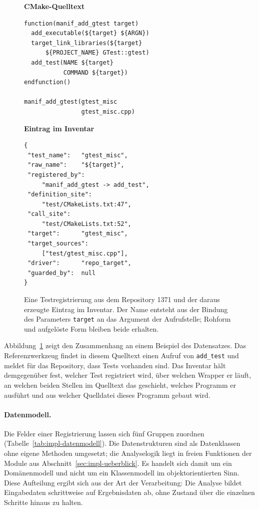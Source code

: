 \documentclass[12pt,a4paper,twoside,headsepline,parskip=half]{scrreprt}
\begin{document}
\begin{figure}[H]
    \centering
    \scriptsize
    \begin{minipage}[t]{0.35\textwidth}
        \textbf{\footnotesize CMake-Quelltext}
\begin{verbatim}
function(manif_add_gtest target)
  add_executable(${target} ${ARGN})
  target_link_libraries(${target}
      ${PROJECT_NAME} GTest::gtest)
  add_test(NAME ${target}
           COMMAND ${target})
endfunction()

manif_add_gtest(gtest_misc
                gtest_misc.cpp)
\end{verbatim}
    \end{minipage}\hspace{0.04\textwidth}%
    \begin{minipage}[t]{0.36\textwidth}
        \textbf{\footnotesize Eintrag im Inventar}
\begin{verbatim}
{
 "test_name":   "gtest_misc",
 "raw_name":    "${target}",
 "registered_by":
     "manif_add_gtest -> add_test",
 "definition_site":
     "test/CMakeLists.txt:47",
 "call_site":
     "test/CMakeLists.txt:52",
 "target":      "gtest_misc",
 "target_sources":
     ["test/gtest_misc.cpp"],
 "driver":      "repo_target",
 "guarded_by":  null
}
\end{verbatim}
    \end{minipage}

    \captionsetup{width=0.75\linewidth}
    \caption{Eine Testregistrierung aus dem Repository 1371 und der daraus erzeugte
    Eintrag im Inventar. Der Name entsteht aus der Bindung des Parameters
    \texttt{target} an das Argument der Aufrufstelle; Rohform und aufgelöste Form
    bleiben beide erhalten.}
    \label{fig:impl-inventar}
\end{figure}

Abbildung~\ref{fig:impl-inventar} zeigt den Zusammenhang an einem Beispiel des
Datensatzes. Das Referenzwerkzeug findet in diesem Quelltext einen Aufruf von
\texttt{add\_test} und meldet für das Repository, dass Tests vorhanden sind. Das
Inventar hält demgegenüber fest, welcher Test registriert wird, über welchen Wrapper
er läuft, an welchen beiden Stellen im Quelltext das geschieht, welches Programm er
ausführt und aus welcher Quelldatei dieses Programm gebaut wird.

\paragraph{Datenmodell.}
Die Felder einer Registrierung lassen sich fünf Gruppen zuordnen
(Tabelle~\ref{tab:impl-datenmodell}). Die Datenstrukturen sind als Datenklassen ohne
eigene Methoden umgesetzt; die Analyselogik liegt in freien Funktionen der Module aus
Abschnitt~\ref{sec:impl-ueberblick}. Es handelt sich damit um ein Domänenmodell und
nicht um ein Klassenmodell im objektorientierten Sinn. Diese Aufteilung ergibt sich
aus der Art der Verarbeitung: Die Analyse bildet Eingabedaten schrittweise auf
Ergebnisdaten ab, ohne Zustand über die einzelnen Schritte hinaus zu halten.
\end{document}
